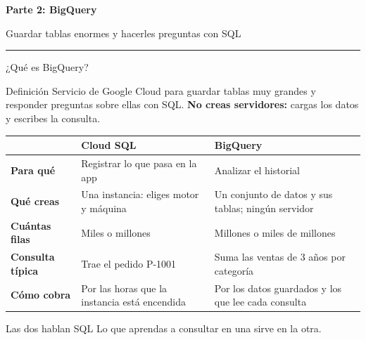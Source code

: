 \documentclass[aspectratio=169,10pt,c]{beamer}
\newcommand{\separador}[2]{%
\begin{frame}[plain]
\vfill
\begin{center}
{\fontsize{29}{34}\selectfont\bfseries #1}\par
\vspace{2mm}
{\small #2}\par
\vspace{4mm}
{\color{utpRojo}\rule{8.5cm}{1.2pt}}
\end{center}
\vfill
\end{frame}}
\begin{document}
\separador{Parte 2: BigQuery}{Guardar tablas enormes y hacerles preguntas con SQL}

\begin{frame}{¿Qué es BigQuery?}
\begin{block}{Definición}
\small Servicio de Google Cloud para guardar tablas muy grandes y responder preguntas sobre ellas con SQL. \textbf{No creas servidores:} cargas los datos y escribes la consulta.
\end{block}
\renewcommand{\arraystretch}{1.15}
\centering\small
\begin{tabular}{@{}p{2.6cm}>{\raggedright\arraybackslash}p{4.9cm}>{\raggedright\arraybackslash}p{5.0cm}@{}}
\toprule
 & \textbf{Cloud SQL} & \textbf{BigQuery}\\
\midrule
\textbf{Para qué} & Registrar lo que pasa en la app & Analizar el historial\\
\textbf{Qué creas} & Una instancia: eliges motor y máquina & Un conjunto de datos y sus tablas; ningún servidor\\
\textbf{Cuántas filas} & Miles o millones & Millones o miles de millones\\
\textbf{Consulta típica} & Trae el pedido P-1001 & Suma las ventas de 3 años por categoría\\
\textbf{Cómo cobra} & Por las horas que la instancia está encendida & Por los datos guardados y los que lee cada consulta\\
\bottomrule
\end{tabular}
\par\vspace{2mm}
\begin{alertblock}{Las dos hablan SQL}
\small Lo que aprendas a consultar en una sirve en la otra.
\end{alertblock}
\end{frame}
\end{document}
